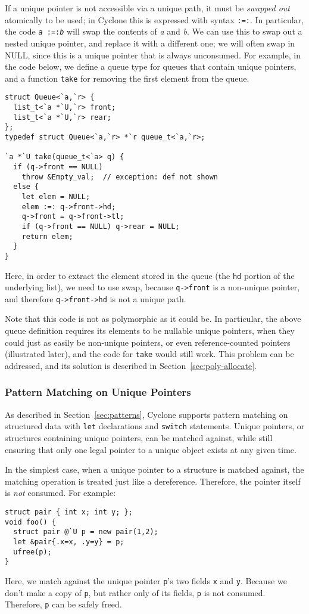 If a unique pointer is not accessible via a unique path, it must be
\emph{swapped out} atomically to be used; in Cyclone this is expressed with
syntax \texttt{:=:}.  In particular, the code \texttt{{\it a} :=:{\it b}}
will swap the contents of {\it a} and {\it b}.  We can use this to swap out
a nested unique pointer, and replace it with a different one; we will often
swap in NULL, since this is a unique pointer that is always unconsumed.  For
example, in the code below, we define a queue type for queues that contain
unique pointers, and a function \texttt{take} for removing the first element
from the queue.
\begin{verbatim}
struct Queue<`a,`r> { 
  list_t<`a *`U,`r> front; 
  list_t<`a *`U,`r> rear; 
};
typedef struct Queue<`a,`r> *`r queue_t<`a,`r>;

`a *`U take(queue_t<`a> q) {
  if (q->front == NULL)
    throw &Empty_val;  // exception: def not shown
  else {
    let elem = NULL;
    elem :=: q->front->hd;
    q->front = q->front->tl;
    if (q->front == NULL) q->rear = NULL;
    return elem;
  }
}
\end{verbatim}
Here, in order to extract the element stored in the queue (the \texttt{hd}
portion of the underlying list), we need to use swap, because
\texttt{q->front} is a non-unique pointer, and therefore
\texttt{q->front->hd} is not a unique path.

Note that this code is not as polymorphic as it could be.  In particular,
the above queue definition requires its elements to be nullable unique
pointers, when they could just as easily be non-unique pointers, or even
reference-counted pointers (illustrated later), and the code for
\texttt{take} would still work.  This problem can be addressed, and its
solution is described in Section~\ref{sec:poly-allocate}.

\subsubsection{Pattern Matching on Unique Pointers}
\label{sec:unique-patterns}

As described in Section~\ref{sec:patterns}, Cyclone supports pattern
matching on structured data with \texttt{let} declarations and
\texttt{switch} statements.  Unique pointers, or structures containing
unique pointers, can be matched against, while still ensuring that only one
legal pointer to a unique object exists at any given time.

In the simplest case, when a unique pointer to a structure is matched
against, the matching operation is treated just like a dereference.
Therefore, the pointer itself is \emph{not} consumed.  For example:
\begin{verbatim}
struct pair { int x; int y; };
void foo() {
  struct pair @`U p = new pair(1,2);
  let &pair{.x=x, .y=y} = p;
  ufree(p);
}
\end{verbatim}
Here, we match against the unique pointer \texttt{p}'s two fields
\texttt{x} and \texttt{y}.  Because we don't make a copy of \texttt{p}, but
rather only of its fields, \texttt{p} is not consumed.  Therefore,
\texttt{p} can be safely freed.

